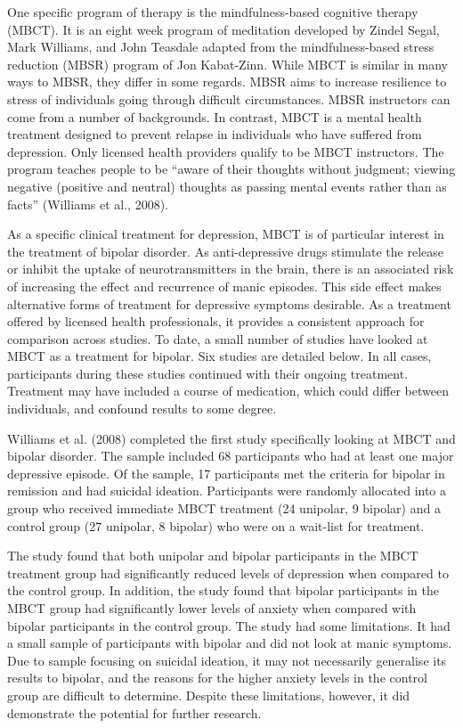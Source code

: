 One specific program of therapy is the mindfulness-based cognitive therapy (MBCT). It is an eight week program of meditation developed by Zindel Segal, Mark Williams, and John Teasdale adapted from the mindfulness-based stress reduction (MBSR) program of Jon Kabat-Zinn. While MBCT is similar in many ways to MBSR, they differ in some regards. MBSR aims to increase resilience to stress of individuals going through difficult circumstances. MBSR instructors can come from a number of backgrounds. In contrast, MBCT is a mental health treatment designed to prevent relapse in individuals who have suffered from depression. Only licensed health providers qualify to be MBCT instructors. The program teaches people to be “aware of their thoughts without judgment; viewing negative (positive and neutral) thoughts as passing mental events rather than as facts” (Williams et al., 2008).

As a specific clinical treatment for depression, MBCT is of particular interest in the treatment of bipolar disorder. As anti-depressive drugs stimulate the release or inhibit the uptake of neurotransmitters in the brain, there is an associated risk of increasing the effect and recurrence of manic episodes. This side effect makes alternative forms of treatment for depressive symptoms desirable. As a treatment offered by licensed health professionals, it provides a consistent approach for comparison across studies. To date, a small number of studies have looked at MBCT as a treatment for bipolar. Six studies are detailed below. In all cases, participants during these studies continued with their ongoing treatment. Treatment may have included a course of medication, which could differ between individuals, and confound results to some degree. 

Williams et al. (2008) completed the first study specifically looking at MBCT and bipolar disorder. The sample included 68 participants who had at least one major depressive episode. Of the sample, 17 participants met the criteria for bipolar in remission and had suicidal ideation. Participants were randomly allocated into a group who received immediate MBCT treatment (24 unipolar, 9 bipolar) and a control group (27 unipolar, 8 bipolar) who were on a wait-list for treatment.

The study found that both unipolar and bipolar participants in the MBCT treatment group had significantly reduced levels of depression when compared to the control group. In addition, the study found that bipolar participants in the MBCT group had significantly lower levels of anxiety when compared with bipolar participants in the control group. The study had some limitations. It had a small sample of participants with bipolar and did not look at manic symptoms. Due to sample focusing on suicidal ideation, it may not necessarily generalise its results to bipolar, and the reasons for the higher anxiety levels in the control group are difficult to determine. Despite these limitations, however, it did demonstrate the potential for further research.

